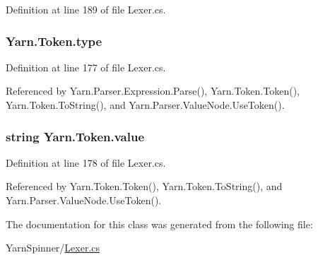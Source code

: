 Definition at line 189 of file Lexer.\-cs.

\hypertarget{a00163_a471a25da67fda0524f2375f9a882aafa}{
\subsubsection[{type}]{ Yarn.\-Token.\-type}}\label{a00163_a471a25da67fda0524f2375f9a882aafa}


Definition at line 177 of file Lexer.\-cs.



Referenced by Yarn.\-Parser.\-Expression.\-Parse(), Yarn.\-Token.\-Token(), Yarn.\-Token.\-To\-String(), and Yarn.\-Parser.\-Value\-Node.\-Use\-Token().

\hypertarget{a00163_a3df6b32d6190a639619a3f064c2154e2}{
\subsubsection[{value}]{\setlength{\rightskip}{0pt plus 5cm}string Yarn.\-Token.\-value}}\label{a00163_a3df6b32d6190a639619a3f064c2154e2}


Definition at line 178 of file Lexer.\-cs.



Referenced by Yarn.\-Token.\-Token(), Yarn.\-Token.\-To\-String(), and Yarn.\-Parser.\-Value\-Node.\-Use\-Token().



The documentation for this class was generated from the following file\-:\begin{DoxyCompactItemize}
\item 
Yarn\-Spinner/\hyperlink{a00292}{Lexer.\-cs}\end{DoxyCompactItemize}
